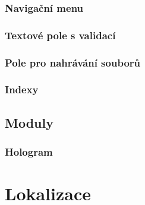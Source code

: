 \subsubsection{Navigační menu}
\subsubsection{Textové pole s validací}
\subsubsection{Pole pro nahrávání souborů}
\subsubsection{Indexy}

\subsection{Moduly}
\subsubsection{Hologram}

\section{Lokalizace}
